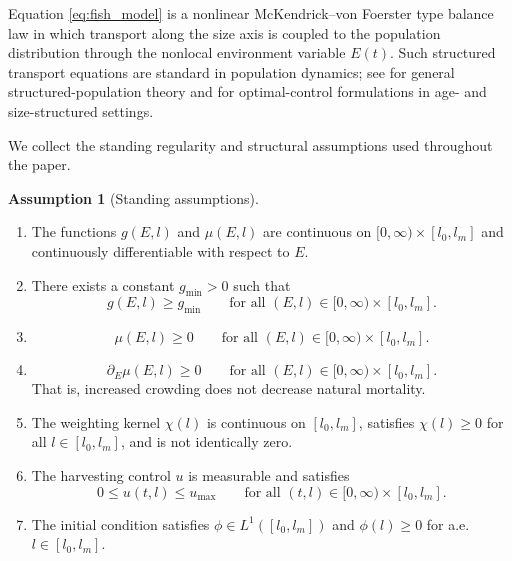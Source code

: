 \documentclass[pdflatex,sn-mathphys-num]{sn-jnl}
\theoremstyle{thmstyleone}
\theoremstyle{definition}
\newtheorem{assumption}[theorem]{Assumption}
\theoremstyle{remark}
\begin{document}
Equation \eqref{eq:fish_model} is a nonlinear McKendrick--von Foerster type
balance law in which transport along the size axis is coupled to the population
distribution through the nonlocal environment variable $E(t)$. Such structured
transport equations are standard in population dynamics; see
\cite{cushing_introduction_1998,diekmann_steady-state_2003,wang2026elliptic} for general
structured-population theory and
\cite{hritonenko_maximum_2008,hritonenko_bangbang_2009,hritonenko_mathematical_2013,ainseba_population_2022,liu2025bidirectional}
for optimal-control formulations in age- and size-structured settings.

We collect the standing regularity and structural assumptions used throughout the
paper.

\begin{assumption}[Standing assumptions]\label{ass:standing}
\begin{enumerate}[label=(H\arabic*)]
\item\label{H:reg}
The functions $g(E,l)$ and $\mu(E,l)$ are continuous on
$[0,\infty)\times[l_0,l_m]$ and continuously differentiable with respect to $E$.

\item\label{H:gpos}
There exists a constant $g_{\min}>0$ such that
\[
g(E,l)\ge g_{\min}
\qquad \text{for all } (E,l)\in[0,\infty)\times[l_0,l_m].
\]

\item\label{H:mupos}
\[
\mu(E,l)\ge 0
\qquad \text{for all } (E,l)\in[0,\infty)\times[l_0,l_m].
\]

\item\label{H:mumono}
\[
\partial_E\mu(E,l)\ge 0
\qquad \text{for all } (E,l)\in[0,\infty)\times[l_0,l_m].
\]
That is, increased crowding does not decrease natural mortality.

\item\label{H:chi}
The weighting kernel $\chi(l)$ is continuous on $[l_0,l_m]$, satisfies
$\chi(l)\ge 0$ for all $l\in[l_0,l_m]$, and is not identically zero.

\item\label{H:uadm}
The harvesting control $u$ is measurable and satisfies
\[
0\le u(t,l)\le u_{\max}
\qquad \text{for all } (t,l)\in[0,\infty)\times[l_0,l_m].
\]

\item\label{H:ic}
The initial condition satisfies $\phi\in L^1([l_0,l_m])$ and
$\phi(l)\ge 0$ for a.e.\ $l\in[l_0,l_m]$.
\end{enumerate}
\end{assumption}
\end{document}
